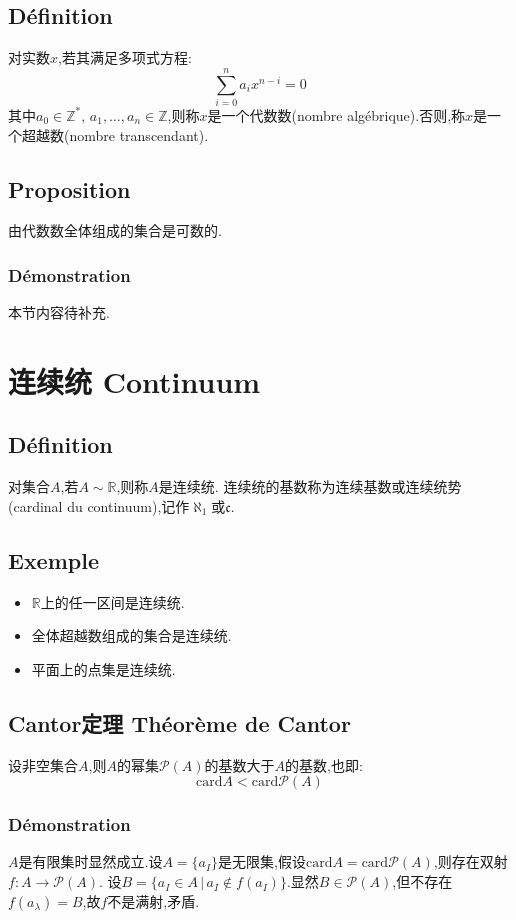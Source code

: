 \documentclass[12pt, a4paper, oneside]{ctexbook}
\newcommand{\card }{\text{card}}%
\newcommand{\R }{\mathbb{R}}%
\newcommand{\Z }{\mathbb{Z}}%
\begin{document}
  \subsection{Définition}
  对实数$x$,若其满足多项式方程:
  $$
  \sum_{i=0}^{n}a_ix^{n-i}=0
  $$
  其中$a_0\in\Z^*,\,a_1,\dots,a_n\in\Z$,则称$x$是一个代数数(nombre algébrique).否则,称$x$是一个超越数(nombre transcendant).
  \subsection{Proposition}
  由代数数全体组成的集合是可数的.
  \subsubsection{Démonstration}

  本节内容待补充.
  \section{连续统 Continuum}
  \subsection{Définition}
  对集合$A$,若$A\sim\R$,则称$A$是连续统.
  连续统的基数称为连续基数或连续统势(cardinal du continuum),记作$\aleph_1$或$\mathfrak{c}$.
  \subsection{Exemple}
  \begin{itemize}
    \item $\R$上的任一区间是连续统.
    \item 全体超越数组成的集合是连续统.
    \item 平面上的点集是连续统.
  \end{itemize}
  \subsection{Cantor定理 Théorème de Cantor}
  设非空集合$A$,则$A$的幂集$\mathcal{P}(A)$的基数大于$A$的基数,也即:
  $$
  \card A<\card \mathcal{P}(A)
  $$
  \subsubsection{Démonstration}
  $A$是有限集时显然成立.设$A=\{a_I\}$是无限集,假设$\card A=\card \mathcal{P}(A)$,则存在双射$f:A\rightarrow \mathcal{P}(A)$.
  设$B=\{a_I\in A\,|\,a_I\notin f(a_I)\}$.显然$B\in\mathcal{P}(A)$,但不存在$f(a_\lambda)=B$,故$f$不是满射,矛盾.
\end{document}
